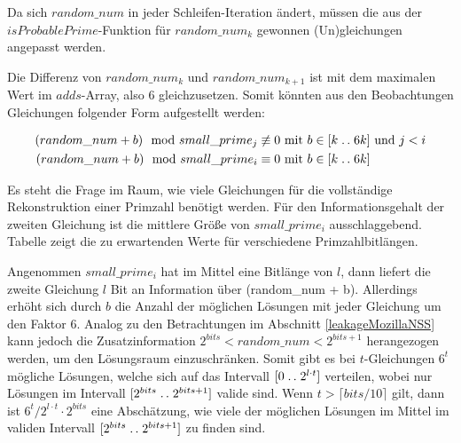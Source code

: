 Da sich $random\_num$ in jeder Schleifen-Iteration ändert, müssen die aus der $isProbablePrime$-Funktion für $random\_num_k$ gewonnen (Un)gleichungen  angepasst werden.

Die Differenz von $random\_num_k$ und $random\_num_{k+1}$ ist mit dem maximalen Wert im $adds$-Array, also 6 gleichzusetzen.
Somit könnten aus den Beobachtungen Gleichungen folgender Form aufgestellt werden:

\begin{align*}
    (random\_num + b) \mod small\_prime_j \not\equiv 0 &\text{ mit } b \in [k\mathrel{{.}\,{.}}\nobreak6k] \text{ und } j < i\\
    (random\_num + b) \mod small\_prime_i \equiv 0 &\text{ mit } b \in [k\mathrel{{.}\,{.}}\nobreak6k]
\end{align*}

Es steht die Frage im Raum, wie viele Gleichungen für die vollständige Rekonstruktion einer Primzahl benötigt werden.
Für den Informationsgehalt der zweiten Gleichung ist die mittlere Größe von $small\_prime_i$ ausschlaggebend.
Tabelle %
zeigt die zu erwartenden Werte für verschiedene Primzahlbitlängen. 

Angenommen $small\_prime_i$ hat im Mittel eine Bitlänge von $l$, dann liefert die zweite Gleichung $l$ Bit an Information über (random\_num + b).
Allerdings erhöht sich durch $b$ die Anzahl der möglichen Lösungen mit jeder Gleichung um den Faktor 6.
Analog zu den Betrachtungen im Abschnitt \ref{leakageMozillaNSS} kann jedoch die Zusatzinformation $2^{bits} < random\_num < 2^{bits+1}$ herangezogen werden, um den Lösungsraum einzuschränken.
Somit gibt es bei $t$-Gleichungen $6^t$ mögliche Lösungen, welche sich auf das Intervall $[0 \mathrel{{.}\,{.}}\nobreak2^{l\cdot t}]$ verteilen, wobei nur Lösungen im Intervall $[2^{bits} \mathrel{{.}\,{.}}\nobreak 2^{bits+1}]$ valide sind.
Wenn $t > \lceil bits/10 \rceil$ gilt, dann ist $6^t/2^{l \cdot t} \cdot 2^{bits}$ eine Abschätzung, wie viele der möglichen Lösungen im Mittel im validen Intervall $[2^{bits} \mathrel{{.}\,{.}}\nobreak 2^{bits+1}]$ zu finden sind.

